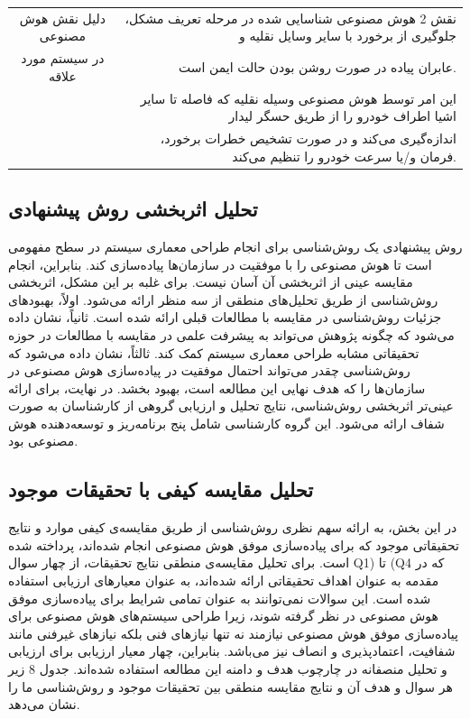 \documentclass[a4paper,10pt]{article}
\begin{document}
\begin{table}[htbp]
\begin{tabularx}{\textwidth}{c c c c X}
                    \multicolumn{2}{c}{دلیل نقش هوش مصنوعی} & \multicolumn{3}{r}{نقش 2 هوش مصنوعی شناسایی شده در مرحله تعریف مشکل، جلوگیری از برخورد با سایر وسایل نقلیه و} \\
                    \multicolumn{2}{c}{در سیستم مورد علاقه} & \multicolumn{3}{r}{عابران پیاده در صورت روشن بودن حالت ایمن است.} \\
                    \multicolumn{2}{c}{} & \multicolumn{3}{r}{این امر توسط هوش مصنوعی وسیله نقلیه که فاصله تا سایر اشیا اطراف خودرو را از طریق حسگر لیدار} \\
                    \multicolumn{2}{c}{} & \multicolumn{3}{r}{اندازه‌گیری می‌کند و در صورت تشخیص خطرات برخورد، فرمان و/یا سرعت خودرو را تنظیم می‌کند.} \\

                    \hline

                \end{tabularx}
                
            \end{table}

        \subsection{تحلیل اثربخشی روش پیشنهادی}

            روش پیشنهادی یک روش‌شناسی برای انجام طراحی معماری سیستم در سطح مفهومی است تا هوش مصنوعی را با موفقیت در سازمان‌ها پیاده‌سازی کند. بنابراین، انجام مقایسه عینی از اثربخشی آن آسان نیست. برای غلبه بر این مشکل، اثربخشی روش‌شناسی از طریق تحلیل‌های منطقی از سه منظر ارائه می‌شود. اولاً، بهبودهای جزئیات روش‌شناسی در مقایسه با مطالعات قبلی ارائه شده است. ثانیاً، نشان داده می‌شود که چگونه پژوهش می‌تواند به پیشرفت علمی در مقایسه با مطالعات در حوزه تحقیقاتی مشابه طراحی معماری سیستم کمک کند. ثالثاً، نشان داده می‌شود که روش‌شناسی چقدر می‌تواند احتمال موفقیت در پیاده‌سازی هوش مصنوعی در سازمان‌ها را که هدف نهایی این مطالعه است، بهبود بخشد. در نهایت، برای ارائه عینی‌تر اثربخشی روش‌شناسی، نتایج تحلیل و ارزیابی گروهی از کارشناسان به صورت شفاف ارائه می‌شود. این گروه کارشناسی شامل پنج برنامه‌ریز و توسعه‌دهنده هوش مصنوعی بود.

        \subsection{تحلیل مقایسه کیفی با تحقیقات موجود}

            در این بخش، به ارائه‌ سهم نظری روش‌شناسی از طریق مقایسه‌ی کیفی موارد و نتایج تحقیقاتی موجود که برای پیاده‌سازی موفق هوش مصنوعی انجام شده‌اند، پرداخته شده است. برای تحلیل مقایسه‌ی منطقی نتایج تحقیقات، از چهار سوال Q1) تا (Q4 که در مقدمه به عنوان اهداف تحقیقاتی ارائه شده‌اند، به عنوان معیارهای ارزیابی استفاده شده است. این سوالات نمی‌توانند به عنوان تمامی شرایط برای پیاده‌سازی موفق هوش مصنوعی در نظر گرفته شوند، زیرا طراحی سیستم‌های هوش مصنوعی برای پیاده‌سازی موفق هوش مصنوعی نیازمند نه تنها نیازهای فنی بلکه نیازهای غیرفنی مانند شفافیت، اعتمادپذیری و انصاف نیز می‌باشد. بنابراین، چهار معیار ارزیابی برای ارزیابی و تحلیل منصفانه در چارچوب هدف و دامنه این مطالعه استفاده شده‌اند. جدول 8 زیر هر سوال و هدف آن و نتایج مقایسه منطقی بین تحقیقات موجود و روش‌شناسی ما را نشان می‌دهد.
\end{document}
